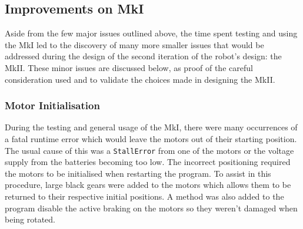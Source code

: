 \documentclass{report}
\begin{document}
	\subsection{Improvements on MkI}
	Aside from the few major issues outlined above, the time spent testing and using the MkI led to the discovery of many more smaller issues that would be addressed during the design of the second iteration of the robot's design: the MkII. These minor issues are discussed below, as proof of the careful consideration used and to validate the choices made in designing the MkII.
	
	\subsubsection{Motor Initialisation}
	
	During the testing and general usage of the MkI, there were many occurrences of a fatal runtime error which would leave the motors out of their starting position. The usual cause of this was a \lstinline|StallError| from one of the motors or the voltage supply from the batteries becoming too low. The incorrect positioning required the motors to be initialised when restarting the program. To assist in this procedure, large black gears were added to the motors which allows them to be returned to their respective initial positions. A method was also added to the program disable the active braking on the motors so they weren't damaged when being rotated.
	
\end{document}
